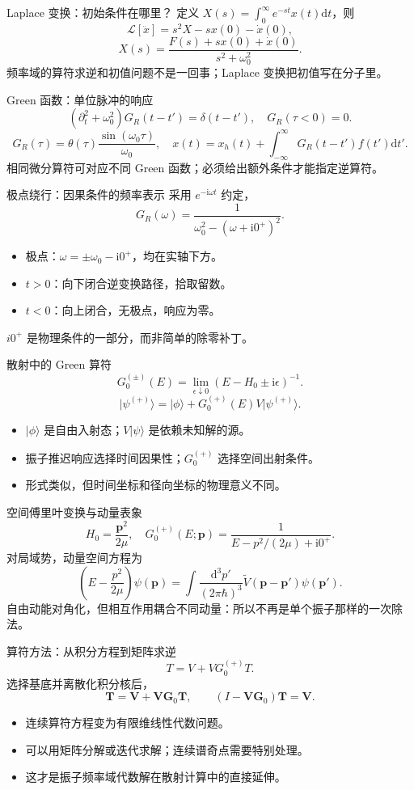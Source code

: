 \documentclass[aspectratio=169,11pt]{beamer}
\newcommand{\dd}{\mathrm d}
\newcommand{\ii}{\mathrm i}
\newcommand{\ket}[1]{\lvert #1\rangle}
\begin{document}
\begin{frame}{Laplace 变换：初始条件在哪里？}
定义 $X(s)=\int_0^\infty e^{-st}x(t)\dd t$，则
\[
\mathcal L[\ddot x]=s^2X-sx(0)-\dot x(0),
\]
\[
X(s)=\frac{F(s)+sx(0)+\dot x(0)}{s^2+\omega_0^2}.
\]
频率域的算符求逆和初值问题不是一回事；Laplace 变换把初值写在分子里。
\end{frame}
\begin{frame}{Green 函数：单位脉冲的响应}
\[
(\partial_t^2+\omega_0^2)G_R(t-t')=\delta(t-t'),
\quad G_R(\tau<0)=0.
\]
\[
G_R(\tau)=\theta(\tau)\frac{\sin(\omega_0\tau)}{\omega_0},
\quad
x(t)=x_h(t)+\int_{-\infty}^\infty G_R(t-t')f(t')\dd t'.
\]
相同微分算符可对应不同 Green 函数；必须给出额外条件才能指定逆算符。
\end{frame}
\begin{frame}{极点绕行：因果条件的频率表示}
采用 $e^{-\ii\omega t}$ 约定，
\[
G_R(\omega)=\frac{1}{\omega_0^2-(\omega+\ii0^+)^2}.
\]
\begin{itemize}
\item 极点：$\omega=\pm\omega_0-\ii0^+$，均在实轴下方。
\item $t>0$：向下闭合逆变换路径，拾取留数。
\item $t<0$：向上闭合，无极点，响应为零。
\end{itemize}
$i0^+$ 是物理条件的一部分，而非简单的除零补丁。
\end{frame}
\begin{frame}{散射中的 Green 算符}
\[
G_0^{(\pm)}(E)=\lim_{\epsilon\downarrow0}
(E-H_0\pm\ii\epsilon)^{-1}.
\]
\[
\ket{\psi^{(+)}}=\ket{\phi}+G_0^{(+)}(E)V\ket{\psi^{(+)}}.
\]
\begin{itemize}
\item $\ket{\phi}$ 是自由入射态；$V\ket{\psi}$ 是依赖未知解的源。
\item 振子推迟响应选择时间因果性；$G_0^{(+)}$ 选择空间出射条件。
\item 形式类似，但时间坐标和径向坐标的物理意义不同。
\end{itemize}
\end{frame}
\begin{frame}{空间傅里叶变换与动量表象}
\[
H_0=\frac{\bm p^2}{2\mu},\quad
G_0^{(+)}(E;\bm p)=\frac{1}{E-p^2/(2\mu)+\ii0^+}.
\]
对局域势，动量空间方程为
\[
\left(E-\frac{p^2}{2\mu}\right)\psi(\bm p)
=\int\frac{\dd^3p'}{(2\pi\hbar)^3}
\widetilde V(\bm p-\bm p')\psi(\bm p').
\]
自由动能对角化，但相互作用耦合不同动量：所以不再是单个振子那样的一次除法。
\end{frame}
\begin{frame}{算符方法：从积分方程到矩阵求逆}
\[
T=V+VG_0^{(+)}T.
\]
选择基底并离散化积分核后，
\[
\bm T=\bm V+\bm V\bm G_0\bm T,\qquad
(I-\bm V\bm G_0)\bm T=\bm V.
\]
\begin{itemize}
\item 连续算符方程变为有限维线性代数问题。
\item 可以用矩阵分解或迭代求解；连续谱奇点需要特别处理。
\item 这才是振子频率域代数解在散射计算中的直接延伸。
\end{itemize}
\end{frame}
\end{document}
